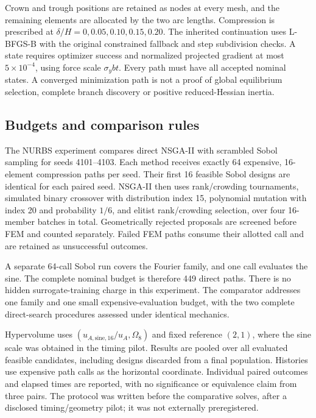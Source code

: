 \documentclass[10pt,twocolumn]{article}
\newcommand{\ua}{u_A}
\newcommand{\om}{\Omega_8}
\begin{document}
Crown and trough positions are retained as nodes at every mesh, and the remaining elements are allocated by the two arc lengths. Compression is prescribed at $\delta/H=0,0.05,0.10,0.15,0.20$. The inherited continuation uses L-BFGS-B with the original constrained fallback and step subdivision checks. A state requires optimizer success and normalized projected gradient at most $5\times10^{-4}$, using force scale $\sigma_ybt$. Every path must have all accepted nominal states. A converged minimization path is not a proof of global equilibrium selection, complete branch discovery or positive reduced-Hessian inertia.

\subsection{Budgets and comparison rules}
The NURBS experiment compares direct NSGA-II with scrambled Sobol sampling \citep{Deb2002,JoeKuo2008} for seeds 4101--4103. Each method receives exactly 64 expensive, 16-element compression paths per seed. Their first 16 feasible Sobol designs are identical for each paired seed. NSGA-II then uses rank/crowding tournaments, simulated binary crossover with distribution index 15, polynomial mutation with index 20 and probability $1/6$, and elitist rank/crowding selection, over four 16-member batches in total. Geometrically rejected proposals are screened before FEM and counted separately. Failed FEM paths consume their allotted call and are retained as unsuccessful outcomes.

A separate 64-call Sobol run covers the Fourier family, and one call evaluates the sine. The complete nominal budget is therefore 449 direct paths. There is no hidden surrogate-training charge in this experiment. The comparator addresses one family and one small expensive-evaluation budget, with the two complete direct-search procedures assessed under identical mechanics.

Hypervolume uses $(u_{A,\mathrm{sine},16}/\ua,\om)$ and fixed reference $(2,1)$, where the sine scale was obtained in the timing pilot. Results are pooled over all evaluated feasible candidates, including designs discarded from a final population. Histories use expensive path calls as the horizontal coordinate. Individual paired outcomes and elapsed times are reported, with no significance or equivalence claim from three pairs. The protocol was written before the comparative solves, after a disclosed timing/geometry pilot; it was not externally preregistered.
\end{document}
